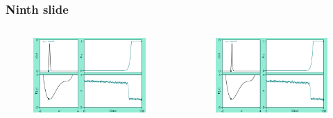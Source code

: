 \documentclass[./main.tex]{subfiles}
\begin{document}
\begin{frame}[label=slide09]
        \frametitle{Ninth slide}

        \begin{columns}
                \begin{figure}
                    \centering
                    \includegraphics[keepaspectratio, width=\textwidth]{../figures/figure.png}
                \end{figure}
                \begin{figure}
                    \centering
                    \includegraphics[keepaspectratio, width=\textwidth]{../figures/figure.png}
                \end{figure}
                

\end{columns}
\end{frame}
\end{document}
